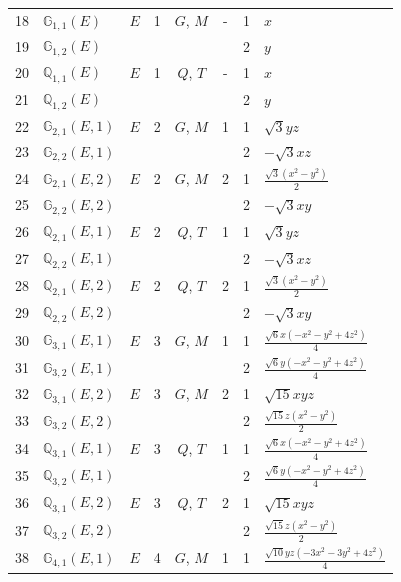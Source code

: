 \documentclass[fleqn,10pt,landscape]{jsarticle}
\begin{document}
\begin{longtable}[l]{clcccccl}
18 & $\mathbb{G}_{1,1}(E)$ & $E$ & 1 & $G$, $M$ & - & 1 & $x$ \\
19 & $\mathbb{G}_{1,2}(E)$ &  &  &  &  & 2 & $y$ \\ \hline
20 & $\mathbb{Q}_{1,1}(E)$ & $E$ & 1 & $Q$, $T$ & - & 1 & $x$ \\
21 & $\mathbb{Q}_{1,2}(E)$ &  &  &  &  & 2 & $y$ \\ \hline
22 & $\mathbb{G}_{2,1}(E,1)$ & $E$ & 2 & $G$, $M$ & 1 & 1 & $\sqrt{3} y z$ \\
23 & $\mathbb{G}_{2,2}(E,1)$ &  &  &  &  & 2 & $- \sqrt{3} x z$ \\ \hline
24 & $\mathbb{G}_{2,1}(E,2)$ & $E$ & 2 & $G$, $M$ & 2 & 1 & $\frac{\sqrt{3} \left(x^{2} - y^{2}\right)}{2}$ \\
25 & $\mathbb{G}_{2,2}(E,2)$ &  &  &  &  & 2 & $- \sqrt{3} x y$ \\ \hline
26 & $\mathbb{Q}_{2,1}(E,1)$ & $E$ & 2 & $Q$, $T$ & 1 & 1 & $\sqrt{3} y z$ \\
27 & $\mathbb{Q}_{2,2}(E,1)$ &  &  &  &  & 2 & $- \sqrt{3} x z$ \\ \hline
28 & $\mathbb{Q}_{2,1}(E,2)$ & $E$ & 2 & $Q$, $T$ & 2 & 1 & $\frac{\sqrt{3} \left(x^{2} - y^{2}\right)}{2}$ \\
29 & $\mathbb{Q}_{2,2}(E,2)$ &  &  &  &  & 2 & $- \sqrt{3} x y$ \\ \hline
30 & $\mathbb{G}_{3,1}(E,1)$ & $E$ & 3 & $G$, $M$ & 1 & 1 & $\frac{\sqrt{6} x \left(- x^{2} - y^{2} + 4 z^{2}\right)}{4}$ \\
31 & $\mathbb{G}_{3,2}(E,1)$ &  &  &  &  & 2 & $\frac{\sqrt{6} y \left(- x^{2} - y^{2} + 4 z^{2}\right)}{4}$ \\ \hline
32 & $\mathbb{G}_{3,1}(E,2)$ & $E$ & 3 & $G$, $M$ & 2 & 1 & $\sqrt{15} x y z$ \\
33 & $\mathbb{G}_{3,2}(E,2)$ &  &  &  &  & 2 & $\frac{\sqrt{15} z \left(x^{2} - y^{2}\right)}{2}$ \\ \hline
34 & $\mathbb{Q}_{3,1}(E,1)$ & $E$ & 3 & $Q$, $T$ & 1 & 1 & $\frac{\sqrt{6} x \left(- x^{2} - y^{2} + 4 z^{2}\right)}{4}$ \\
35 & $\mathbb{Q}_{3,2}(E,1)$ &  &  &  &  & 2 & $\frac{\sqrt{6} y \left(- x^{2} - y^{2} + 4 z^{2}\right)}{4}$ \\ \hline
36 & $\mathbb{Q}_{3,1}(E,2)$ & $E$ & 3 & $Q$, $T$ & 2 & 1 & $\sqrt{15} x y z$ \\
37 & $\mathbb{Q}_{3,2}(E,2)$ &  &  &  &  & 2 & $\frac{\sqrt{15} z \left(x^{2} - y^{2}\right)}{2}$ \\ \hline
38 & $\mathbb{G}_{4,1}(E,1)$ & $E$ & 4 & $G$, $M$ & 1 & 1 & $\frac{\sqrt{10} y z \left(- 3 x^{2} - 3 y^{2} + 4 z^{2}\right)}{4}$ \\

\end{longtable}
\end{document}
